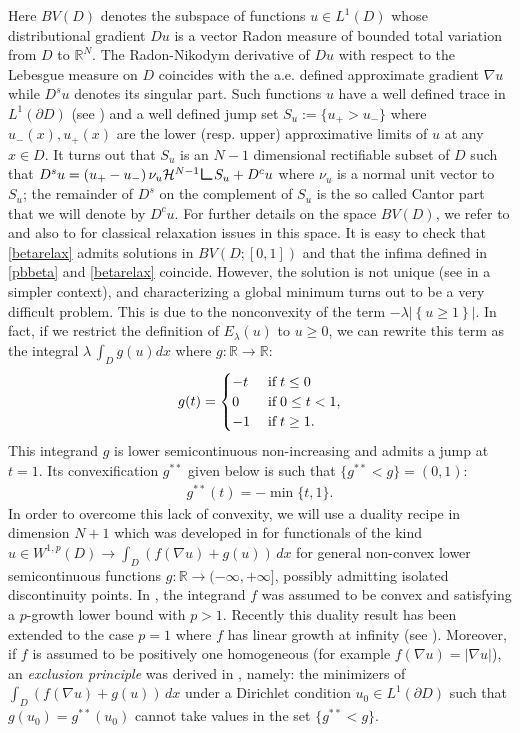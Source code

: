 \documentclass[reqno,11pt]{amsart}
\theoremstyle{definition}
\numberwithin{equation}{section}
\newcommand{\HH}{\mathcal{H}}
\newcommand{\RR}{\mathbb{R}}
\def\R{\mathbb{R}}
\newcommand{\tinm}[1]{\text{\;#1\;}}
\newcommand{\1}{{{\bf 1}\kern-0,28em\rm l}}
\newcommand{\aco}[1]{\left\{#1\right\}}
\def\res{\text{\huge$\llcorner$}}
\begin{document}
Here $BV(D)$ denotes the subspace of functions $u\in L^1(D)$ whose distributional gradient $Du$  is a vector Radon measure of bounded total variation from $D$ to $\RR^N$. The Radon-Nikodym derivative of $Du$ with respect to the Lebesgue measure on $D$ coincides with the a.e. defined approximate gradient $\nabla u$ while $D^s u$ denotes its singular part. Such functions $u$ have a well defined trace  in $L^1(\partial D)$ (see \cite{Suquet}) and a well defined jump set $S_u:=\{u_+>u_-\}$ where $u_-(x),u_+(x)$ are the lower (resp. upper) approximative limits of $u$ at any $x\in D$. It turns out that $S_u$ is an $N-1$ dimensional rectifiable subset of $D$ such that
  $ D^s u = (u_+- u_-) \, \nu_u \HH^{N-1} \res S_u  + D^c u$ where $\nu_u$ is a normal unit vector to $S_u$;   the remainder of $D^s$ on the complement of $S_u$  is the so called Cantor part that we will denote by $D^c u$.  
For further details on the space $BV(D)$, we refer to  \cite{mua1992bv}  and also to \cite{attouch}  for classical relaxation issues in this space. It is easy to check that \eqref{betarelax} admits solutions in $BV(D;[0,1])$ and that the infima defined in
\eqref{pbbeta} and \eqref{betarelax} coincide. However, the solution is not unique (see \cite{attouch-champion} in a simpler context), and characterizing a global minimum turns out to be a very difficult problem. This is due to the nonconvexity of the term $-\lambda|\aco{u \ge 1}|$. In fact, if we restrict the definition of $E_\lambda(u)$ to $u\ge 0$, we can rewrite this term as the integral $\lambda \, \int_D g (u)dx$ where $g: \R\to \R$:
\begin{align}\label{def:g}
g(t)=\begin{cases} -  t & \tinm{if} t\le 0 \\ 
0 &\tinm{if} 0\le t<1,\\
- 1 &\tinm{if} t\ge 1.
\end{cases}
\end{align}
This integrand $g$ is lower semicontinuous non-increasing and admits a jump at $t=1$. Its convexification $g^{**}$
given below is such that $\{g^{**}<g\}=(0,1)$:
\begin{align}\label{co-g}
 g^{**}(t) =  -  \min \{t, 1\} .
\end{align}  
In order to overcome this lack of convexity,  we will use a duality recipe in dimension $N+1$ which was developed  in \cite{boufra2018} for functionals of the kind $u\in W^{1,p}(D) \to \int_D (f(\nabla u)+ g(u))\, dx$  
for general non-convex lower semicontinuous functions  $g:\R\to (-\infty,+\infty]$, possibly admitting isolated discontinuity points. 
In \cite{boufra2018}, the integrand $f$ was assumed to be convex  and satisfying a $p$-growth lower bound with $p>1$. Recently this duality result has been extended to the case $p=1$ where $f$ has linear growth at infinity (see \cite{bouphan2025}). Moreover,  if $f$ is assumed to be positively one homogeneous (for example $f(\nabla u)=|\nabla u|$),
 an  {\em exclusion principle} was derived in \cite{bouphan2025},  namely:  the minimizers of $\int_D (f(\nabla u)+ g(u))\, dx$ under a Dirichlet condition  $u_0\in L^1(\partial D)$ such that $g(u_0)= g^{**}(u_0)$ cannot take values in the set $\{g^{**}<g\}$.
\medskip
\end{document}
